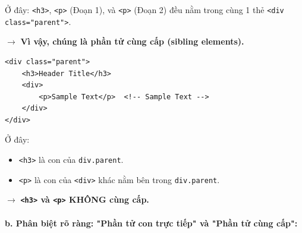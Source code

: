 \documentclass[11pt,oneside]{book}
\newcommand{\thd}[1]{\textcolor{white}{\textbf{\strut #1}}}
\newcommand{\codeinline}[1]{\textcolor{accentOrange}{\texttt{#1}}}
\begin{document}
\begin{noteBox}
Ở đây: \codeinline{<h3>}, \codeinline{<p>} (Đoạn 1), và \codeinline{<p>} (Đoạn 2) đều nằm trong cùng 1 thẻ \codeinline{<div class="parent">}.
\par
$\rightarrow$ \textbf{Vì vậy, chúng là phần tử cùng cấp (sibling elements).}
\end{noteBox}

\begin{codeWindow}
\begin{lstlisting}[language=HTML5]
<div class="parent">
    <h3>Header Title</h3>
    <div>
        <p>Sample Text</p>  <!-- Sample Text -->
    </div>
</div>
\end{lstlisting}
\end{codeWindow}

\begin{warnBox}
Ở đây:
\begin{itemize}[leftmargin=1.5em, itemsep=2pt, parsep=0pt]
    \item \codeinline{<h3>} là con của \codeinline{div.parent}.
    \item \codeinline{<p>} là con của \codeinline{<div>} khác nằm bên trong \codeinline{div.parent}.
\end{itemize}
$\rightarrow$ \textbf{\codeinline{<h3>} và \codeinline{<p>} KHÔNG cùng cấp.}
\end{warnBox}

\paragraph{b. Phân biệt rõ ràng: "Phần tử con trực tiếp" và "Phần tử cùng cấp":}

\begin{prettyTableBox}
\sffamily\small
{}
\end{prettyTableBox}
\end{document}
